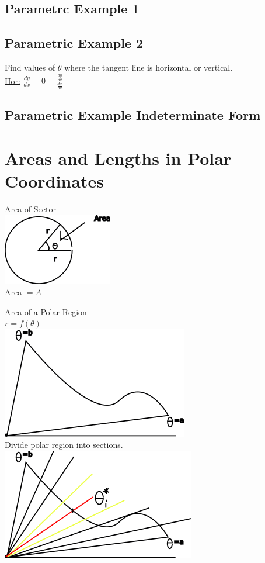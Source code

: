 \documentclass[12pt]{article}
\begin{document}
\subsection{Parametrc Example 1}


\subsection{Parametric Example 2}
Find  values of $\theta$ where the tangent line is horizontal or vertical.\\%
\underline{Hor:} $\frac{dy}{dx}=0=\frac{\frac{dy}{d\theta}}{\frac{dx}{d\theta}}$


\subsection{Parametric Example Indeterminate Form}
\section{Areas and Lengths in Polar Coordinates}
\underline{Area of Sector}\\%
\includegraphics{areaofsector}\\%
Area $= A$

\underline{Area of a Polar Region}\\%
$r=f(\theta)$\\%
\includegraphics{areaofpolarregion}\\%
\bigskip
Divide polar region into sections.\\%
\bigskip
\includegraphics{areaofpolarregioncut}
\end{document}
